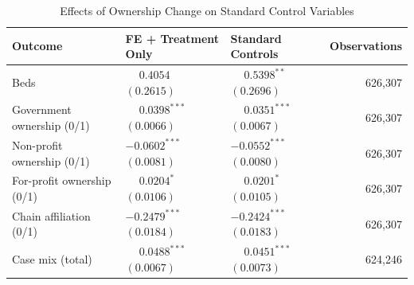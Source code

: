 \documentclass[12pt]{article}
\begin{document}
\begin{table}[H]
\centering
\caption{Effects of Ownership Change on Standard Control Variables}
\label{tab:fe-only-standard-controls}
\small
\setlength{\tabcolsep}{6pt}
\begin{tabularx}{\textwidth}{@{} l Y Y r @{}}
\toprule
Outcome & FE + Treatment Only & Standard Controls & Observations \\
\midrule
Beds &  &  & 626,307 \\
Government ownership (0/1) &  &  & 626,307 \\
Non-profit ownership (0/1) &  &  & 626,307 \\
For-profit ownership (0/1) &  &  & 626,307 \\
Chain affiliation (0/1) &  &  & 626,307 \\
Case mix (total) &  &  & 624,246 \\
\bottomrule
\end{tabularx}
\end{table}
\end{document}
